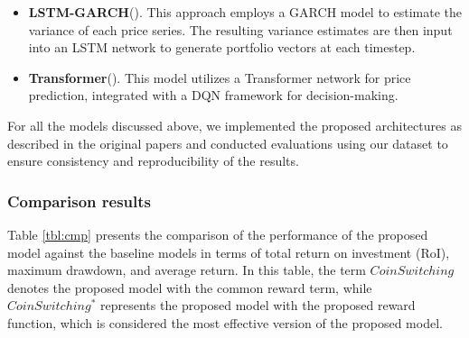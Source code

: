 \begin{itemize}
	\item \textbf{LSTM-GARCH}(\citet{garcia2024lstm}). This approach employs a GARCH model to estimate the variance of each price series. The resulting variance estimates are then input into an LSTM network to generate portfolio vectors at each timestep.
	
	\item \textbf{Transformer}(\citet{kumar2024transformer}). This model utilizes a Transformer network for price prediction, integrated with a DQN framework for decision-making.
	
\end{itemize}

For all the models discussed above, we implemented the proposed architectures as described in the original papers and conducted evaluations using our dataset to ensure consistency and reproducibility of the results.


\subsubsection{Comparison results}

Table \ref{tbl:cmp} presents the comparison of the performance of the proposed model against the baseline models in terms of total return on investment (RoI), maximum drawdown, and average return. In this table, the term $CoinSwitching$ denotes the proposed model with the common reward term, while $CoinSwitching^*$ represents the proposed model with the proposed reward function, which is considered the most effective version of the proposed model.

